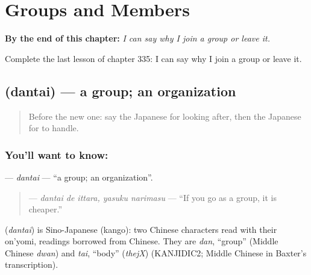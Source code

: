 
\chapter{Groups and Members}
\label{ch:ja-groups-and-members}

\begin{chapteropening}
\textbf{By the end of this chapter:} \emph{I can say why I join a group or leave it.}

Complete the last lesson of chapter 335: I can say why I join a group or leave it.
\end{chapteropening}

\section[\texorpdfstring{\ja{だんたい} (dantai)}{だんたい (dantai)}]{ (dantai) — a group; an organization}

\label{lesson:JA-C335-dantai}



\begin{quote}
Before the new one: say the Japanese for looking after, then the Japanese for to handle.
\end{quote}

\subsection*{You'll want to know: }
\textbf{} — \emph{dantai} — \textquotedblleft{}a group; an organization\textquotedblright{}.

\begin{quote}
\textbf{  } — \emph{dantai de ittara, yasuku narimasu} — \textquotedblleft{}If you go as a group, it is cheaper.\textquotedblright{}
\end{quote}

\begin{cousinweb}
\textbf{} (\emph{dantai}) is Sino-Japanese (kango): two Chinese characters read with their on'yomi, readings borrowed from Chinese. They are \emph{dan}, \textquotedblleft{}group\textquotedblright{} (Middle Chinese \emph{dwan}) and \emph{tai}, \textquotedblleft{}body\textquotedblright{} (\emph{thejX}) (KANJIDIC2; Middle Chinese in Baxter's transcription).
\end{cousinweb}

